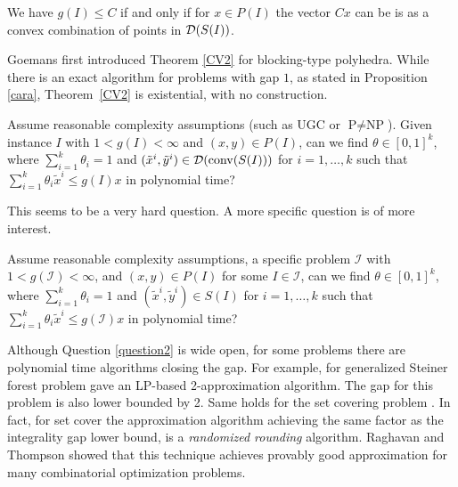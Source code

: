 \begin{thm} \label{CV2}
	We have $g(I) \leq C$ if and only if for $x\in P(I)$ the vector $Cx$ can be is as a convex combination of points in $\operatorname{\mathcal{D}}(S(I))$. 
\end{thm}
Goemans \cite{goemansblocking} first introduced Theorem \ref{CV2} for blocking-type polyhedra. While there is an exact algorithm for problems with gap $1$, as stated in Proposition \ref{cara}, Theorem~\ref{CV2} is existential, with no construction.
\iffalse

\begin{question*}\label{question1}
	Assume reasonable complexity assumptions (such as UGC or $\textrm{P}\neq \textrm{NP}$). Given instance $I$ with $1<g(I)<\infty$ and $(x,y)\in P(I)$, can we find $\theta \in [0,1]^k$, where $\sum_{i=1}^{k}\theta_i =1$ and $(\tilde{x}^i,\tilde{y}^i)\in \operatorname{\mathcal{D}}(\operatorname{conv}(S(I)))$ for $i=1,\ldots,k$ such that $\sum_{i=1}^{k}\theta_i \tilde{x}^i\leq g(I)x$ in polynomial time?
\end{question*}

This seems to be a very hard question. A more specific question is of more interest.

\begin{question}\label{question2}
	Assume reasonable complexity assumptions, a specific problem $\mathcal{I}$ with  $1<g({\mathcal{I}})<\infty$, and $(x,y)\in P(I)$ for some $I\in \mathcal{I}$, can we find $\theta \in [0,1]^k$, where $\sum_{i=1}^{k}\theta_i =1$ and $(\tilde{x}^i,\tilde{y}^i)\in S(I)$ for $i=1,\ldots,k$ such that $\sum_{i=1}^{k}\theta_i \tilde{x}^i\leq g(\mathcal{I})x$ in polynomial time?
\end{question}
Although Question \ref{question2} is wide open, for some problems there are polynomial time algorithms closing the gap. For example, for generalized Steiner forest problem \cite{jain} gave an LP-based 2-approximation algorithm. The gap for this problem is also lower bounded by 2. Same holds for the set covering problem \cite{randomizedrounding}. In fact, for set cover the approximation algorithm achieving the same factor as the integrality gap lower bound, is a \textit{randomized rounding} algorithm. Raghavan and Thompson \cite{randomizedrounding} showed that this technique achieves provably good approximation for many combinatorial optimization problems.  

